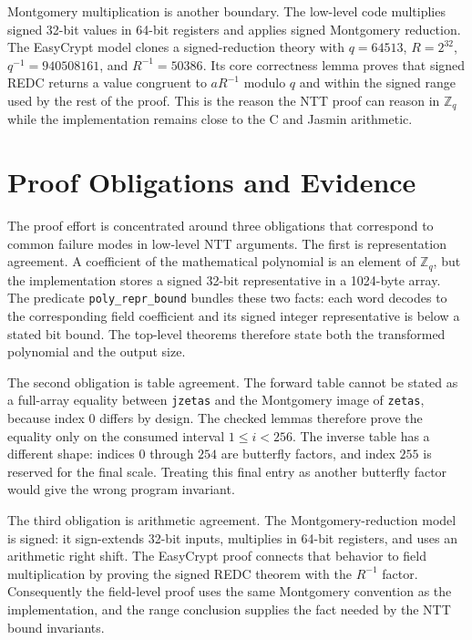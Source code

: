 \documentclass[10pt,twocolumn]{article}
\newcommand{\ec}{EasyCrypt}
\newcommand{\jasmin}{Jasmin}
\newcommand{\Zq}{\mathbb{Z}_q}
\begin{document}
Montgomery multiplication is another boundary. The low-level code multiplies
signed 32-bit values in 64-bit registers and applies signed Montgomery reduction.
The \ec{} model clones a signed-reduction theory with \(q=64513\),
\(R=2^{32}\), \(q^{-1}=940508161\), and \(R^{-1}=50386\). Its core correctness
lemma proves that signed REDC returns a value congruent to \(aR^{-1}\) modulo
\(q\) and within the signed range used by the rest of the proof. This is the
reason the NTT proof can reason in \(\Zq\) while the implementation remains close
to the C and \jasmin{} arithmetic.

\section{Proof Obligations and Evidence}

The proof effort is concentrated around three obligations that correspond to
common failure modes in low-level NTT arguments. The first is representation
agreement. A coefficient of the mathematical polynomial is an element of
\(\Zq\), but the implementation stores a signed 32-bit representative in a
1024-byte array. The predicate \texttt{poly\_repr\_bound} bundles these two
facts: each word decodes to the corresponding field coefficient and its signed
integer representative is below a stated bit bound. The top-level theorems
therefore state both the transformed polynomial and the output size.

The second obligation is table agreement. The forward table cannot be stated as
a full-array equality between \texttt{jzetas} and the Montgomery image of
\texttt{zetas}, because index 0 differs by design. The checked lemmas therefore
prove the equality only on the consumed interval \(1\leq i<256\). The inverse
table has a different shape: indices \(0\) through \(254\) are butterfly factors,
and index \(255\) is reserved for the final scale. Treating this final entry as
another butterfly factor would give the wrong program invariant.

The third obligation is arithmetic agreement. The Montgomery-reduction model is
signed: it sign-extends 32-bit inputs, multiplies in 64-bit registers, and uses
an arithmetic right shift. The \ec{} proof connects that behavior to field
multiplication by proving the signed REDC theorem with the \(R^{-1}\) factor.
Consequently the field-level proof uses the same Montgomery convention as the
implementation, and the range conclusion supplies the fact needed by the NTT
bound invariants.
\end{document}
